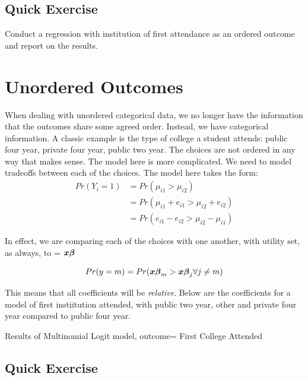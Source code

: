 \documentclass[12 pt]{article}
\begin{document}
\clearpage

\subsection{Quick Exercise}
\label{sec:quick-exercise}

Conduct a regression with institution of first attendance as an ordered outcome
and report on the results. 


\section{ Unordered Outcomes}
When dealing with unordered categorical data, we no longer have the information that
the outcomes share some agreed order. Instead, we have categorical information. A
classic example is the type of college a student attends: public four year, private four
year, public two year. The choices are not ordered in any way that makes sense.
The model here is more complicated. We need to model tradeoffs between each of
the choices. The model here takes the form:
\begin{align*}
  Pr(Y_i=1) & =Pr(\mu_{i1}>\mu_{i2})  \\
&=Pr( \mu_{i1} + e_{i1}  > \mu_{i2}+ e_{i2} )  \\
& = Pr( e_{i1} - e_{i2} > \mu_{i2} - \mu_{i1}  ) 
\end{align*}

In effect, we are comparing each of the choices with one another,
with utility set, as always, to = $\boldsymbol{x} \boldsymbol{\beta}$

\begin{equation*}
  Pr(y=m)=Pr(\boldsymbol{x} \boldsymbol{\beta}_m > \boldsymbol{x} \boldsymbol{\beta}_j  \forall  j
  \neq m)
\end{equation*}

This means that all coefficients will be \emph{relative}. Below are
the coefficients for a model of first instiitution attended, with
public two year, other and private four year compared to public four year. 


\begin{table}
  \centering
  \caption{Results of Multinomial Logit model, outcome= First College
    Attended}
   \begin{tiny}

  \label{tab:multi_results}
\end{tiny}
\end{table}

%                 
\clearpage


\subsection{Quick Exercise}
\label{sec:quick-exercise}
\end{document}
